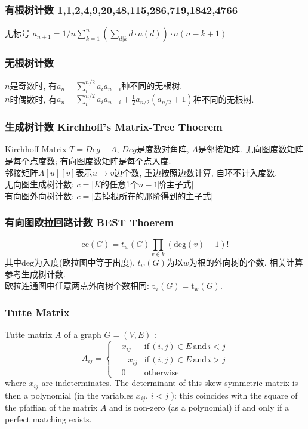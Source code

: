 \subsubsection{有根树计数 1,1,2,4,9,20,48,115,286,719,1842,4766}\noindent
无标号 $a_{n+1} = 1/n  \sum_{k=1}^{n} ( \sum_{d|k} d \cdot a(d) ) \cdot a(n-k+1)$ 
\subsubsection{无根树计数}\noindent
    $n$是奇数时, 有$a_n-\sum_{i}^{n/2}a_ia_{n-i}$种不同的无根树. \\
    $n$时偶数时, 有$a_n-\sum_{i}^{n/2}a_ia_{n-i}+\frac{1}{2}a_{n/2}(a_{n/2}+1)$种不同的无根树. 
\subsubsection{生成树计数 Kirchhoff's Matrix-Tree Thoerem}
    Kirchhoff Matrix $T=Deg-A$, $Deg$是度数对角阵, $A$是邻接矩阵. 无向图度数矩阵是每个点度数; 有向图度数矩阵是每个点入度.\\
    邻接矩阵$A[u][v]$表示$u\rightarrow v$边个数, 重边按照边数计算, 自环不计入度数.\\
    无向图生成树计数: $c=|K$的任意1个$n-1$阶主子式$|$\\
    有向图外向树计数: $c=|$去掉根所在的那阶得到的主子式$|$
\subsubsection{有向图欧拉回路计数 BEST Thoerem}
        \[ \mathrm{ec}(G) = t_w(G)\prod_{v \in{V}}(\mathrm{deg}(v) - 1)! \]
        其中$\mathrm{deg}$为入度(欧拉图中等于出度), $t_w(G)$为以$w$为根的外向树的个数. 相关计算参考生成树计数.\\
        欧拉连通图中任意两点外向树个数相同: $\mathrm{t_v}(G) = \mathrm{t_w}(G)$.
\subsubsection{Tutte Matrix}
    Tutte matrix $A$ of a graph $G=(V,E)$ : 
    \[A_{ij}=\left\{
        \begin{aligned}
            & x_{ij} & \text{if} \, (i,j)\in E \, \text{and}\, i<j \\
            & -x_{ij} & \text{if}\, (i,j)\in E \, \text{and}\, i>j \\
            & 0 & \text{otherwise}
        \end{aligned}
        \right.\]
    where $x_{ij}$ are indeterminates. The determinant of this skew-symmetric matrix is then a polynomial (in the variables $x_{ij}$, $i<j$ ): this coincides with the square of the pfaffian of the matrix $A$ and is non-zero (as a polynomial) if and only if a perfect matching exists.

